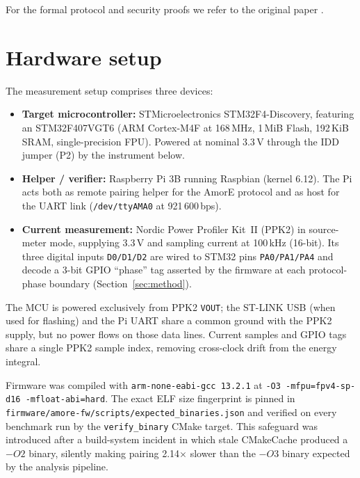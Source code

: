\documentclass[11pt,a4paper]{article}
\begin{document}
For the formal protocol and security proofs we refer to the
original paper \cite{aranha2024}.



\section{Hardware setup}
\label{sec:hardware}

The measurement setup comprises three devices:
\begin{itemize}
  \item \textbf{Target microcontroller:} STMicroelectronics
        STM32F4-Discovery, featuring an STM32F407VGT6 (ARM
        Cortex-M4F at 168\,MHz, 1\,MiB Flash, 192\,KiB SRAM,
        single-precision FPU). Powered at nominal 3.3\,V through
        the IDD jumper (P2) by the instrument below.
  \item \textbf{Helper / verifier:} Raspberry Pi 3B running
        Raspbian (kernel 6.12). The Pi acts both as remote pairing
        helper for the AmorE protocol and as host for the UART
        link (\texttt{/dev/ttyAMA0} at 921\,600\,bps).
  \item \textbf{Current measurement:} Nordic Power Profiler
        Kit~II (PPK2) in source-meter mode, supplying 3.3\,V and
        sampling current at 100\,kHz (16-bit). Its three digital
        inputs \texttt{D0/D1/D2} are wired to STM32 pins
        \texttt{PA0/PA1/PA4} and decode a 3-bit GPIO ``phase''
        tag asserted by the firmware at each protocol-phase
        boundary (Section~\ref{sec:method}).
\end{itemize}

The MCU is powered exclusively from PPK2 \texttt{VOUT}; the
ST-LINK USB (when used for flashing) and the Pi UART share a
common ground with the PPK2 supply, but no power flows on those
data lines. Current samples and GPIO tags share a single PPK2
sample index, removing cross-clock drift from the energy integral.

Firmware was compiled with \texttt{arm-none-eabi-gcc 13.2.1} at
\texttt{-O3 -mfpu=fpv4-sp-d16 -mfloat-abi=hard}. The exact ELF
size fingerprint is pinned in
\texttt{firmware/amore-fw/scripts/expected\_binaries.json} and
verified on every benchmark run by the \texttt{verify\_binary}
CMake target. This safeguard was introduced after a build-system
incident in which stale CMakeCache produced a $-O2$ binary,
silently making pairing 2.14$\times$ slower than the $-O3$ binary
expected by the analysis pipeline.
\end{document}
